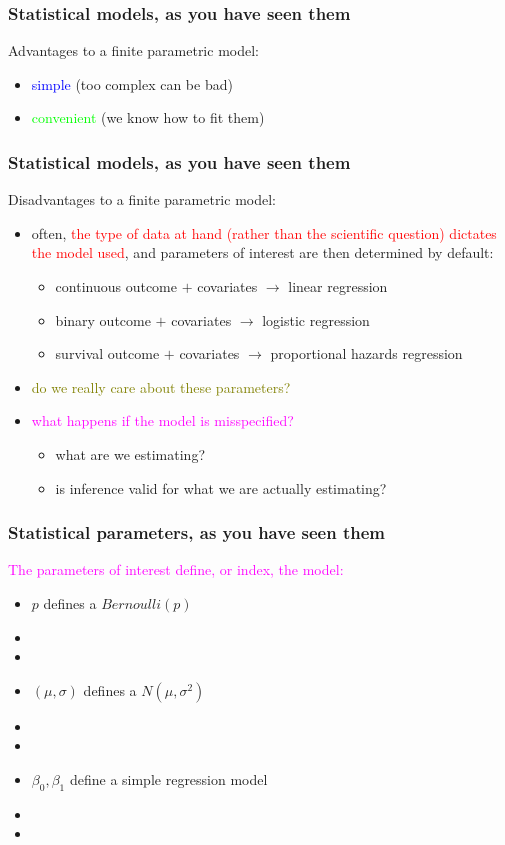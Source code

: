 \documentclass[12pt, 
hyperref={colorlinks=true, linkcolor=blue, urlcolor=cyan}]{beamer}
\begin{document}
\begin{frame}
\frametitle{Statistical models, as you have seen them}
Advantages to a finite parametric model: \vspace{-0.3cm}
\begin{itemize}
\item \textcolor{blue}{simple} (too complex can be bad)
\item \textcolor{lime}{convenient} (we know how to fit them)
\end{itemize}

\end{frame}

\begin{frame}
\frametitle{Statistical models, as you have seen them}
Disadvantages to a finite parametric model: \vspace{-0.3cm}
\begin{itemize}
\item often, \textcolor{red}{the type of data at hand (rather than the scientific question) dictates the model used}, and parameters of interest are then determined by default:
\begin{itemize}
\item continuous outcome $+$ covariates $\rightarrow$ linear regression
\item binary outcome $+$ covariates $\rightarrow$ logistic regression
\item survival outcome $+$ covariates $\rightarrow$ proportional hazards regression
\end{itemize}
\item \textcolor{olive}{do we really care about these parameters?}
\item \textcolor{magenta}{what happens if the model is misspecified?}
\begin{itemize}
\item what are we estimating?
\item is inference valid for what we are actually estimating?
\end{itemize}
\end{itemize}
\end{frame}

\begin{frame}
\frametitle{Statistical parameters, as you have seen them}

\textcolor{magenta}{The parameters of interest define, or index, the model:} \vspace{-0.3cm}
\begin{itemize}
\item $p$ defines a $Bernoulli(p)$
\item[]
\item[]
\item $(\mu, \sigma)$ defines a $N(\mu, \sigma^2)$
\item[]
\item[]
\item $\beta_0, \beta_1$ define a simple regression model
\item[]
\item[]
\end{itemize}

\end{frame}
\end{document}
